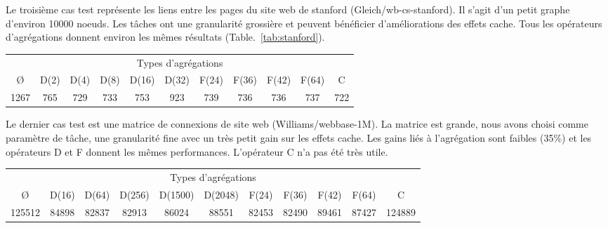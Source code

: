 Le troisième cas test représente les liens entre les pages du site web de stanford (Gleich/wb-cs-stanford).
%
Il s'agit d'un petit graphe d'environ 10000 noeuds.
%
Les tâches ont une granularité grossière et peuvent bénéficier d'améliorations des effets cache.
%
Tous les opérateurs d'agrégations donnent environ les mêmes résultats (Table.~\ref{tab:stanford}).


\begin{center}
  \begin{tabular}{|c|c|c|c|c|c|c|c|c|c|c|}
    \hline
    \multicolumn{11}{|c|}{Types d'agrégations}\\
    \O & D(2) & D(4) & D(8) & D(16) & D(32) & F(24) & F(36) & F(42) & F(64) & C \\
    \hline
    1267 & 765 & 729 & 733 & 753 & 923 & 739 & 736 & 736 & 737 & 722 \\
    \hline
  \end{tabular}
  \label{tab:stanford}
\end{center}


Le dernier cas test est une matrice de connexions de site web (Williams/webbase-1M).
%
La matrice est grande, nous avons choisi comme paramètre de tâche, une granularité fine avec un très petit gain sur les effets cache.
%
Les gains liés à l'agrégation sont faibles (35\%) et les opérateurs D et F donnent les mêmes performances.
%
L'opérateur C n'a pas été très utile.


\begin{center}
  \begin{tabular}{|c|c|c|c|c|c|c|c|c|c|c|}
    \hline
    \multicolumn{11}{|c|}{Types d'agrégations}\\
    \O & D(16) & D(64) & D(256) & D(1500) & D(2048) & F(24) & F(36) & F(42) & F(64) & C \\
    \hline
    125512 & 84898 & 82837 & 82913 & 86024 & 88551 & 82453 & 82490 & 89461 & 87427 & 124889 \\
    \hline
  \end{tabular}
  \label{tab:webbase}
\end{center}

